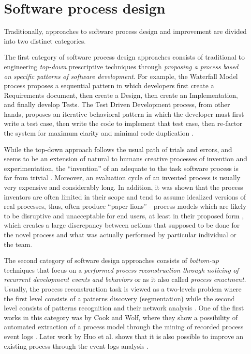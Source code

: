 %
%
\section{Software process design}\label{section_software_process_design}
Traditionally, approaches to software process design and improvement are divided into two distinct categories. 

The first category of software process design approaches consists of traditional to engineering 
\textit{top-down} prescriptive techniques through 
\textit{proposing a process based on specific patterns of software development}. 
For example, the Waterfall Model process proposes a sequential pattern in which developers first create a 
Requirements document, then create a Design, then create an Implementation, and finally develop Tests. 
The Test Driven Development process, from other hands, proposes an iterative behavioral pattern in which
the developer must first write a test case, then write the code to implement that test case, then re-factor the 
system for maximum clarity and minimal code duplication \cite{citeulike:6086365}. 

While the top-down approach follows the usual path of trials and errors, and seems to be an extension 
of natural to humans creative processes of invention and experimentation, 
the ``invention'' of an adequate to the task software process is far from trivial 
\cite{citeulike:5043104} \cite{citeulike:1986013}. Moreover, an evaluation cycle of an invented process
is usually very expensive and considerably long.
In addition, it was shown that the process inventors are often limited in their scope and tend to assume 
idealized versions of real processes, thus, often produce ``paper lions'' - process models which are 
likely to be disruptive and unacceptable for end users, at least in their proposed form 
\cite{citeulike:9758924}, which creates a large discrepancy between actions that supposed to be done for 
the novel process and what was actually performed by particular individual or the team.

The second category of software design approaches consists of \textit{bottom-up} techniques 
that focus on a \textit{performed process reconstruction through noticing of recurrent development 
events and behaviors} or as it also called \textit{process enactment}. 
Usually, the process reconstruction task is viewed as a two-levels problem where the first level 
consists of a patterns discovery (segmentation) while the second level consists of patterns recognition 
and their network analysis \cite{citeulike:2703162}.
One of the first works in this category was by Cook and Wolf, where they show a
possibility of automated extraction of a process model through the mining of recorded 
process event logs \cite{citeulike:328044} \cite{citeulike:5120757} \cite{citeulike:5128143}. 
Later work by Huo et al. shows that it is also possible to improve an existing process
through the event logs analysis \cite{citeulike:7691059} \cite{citeulike:7690766}. 

